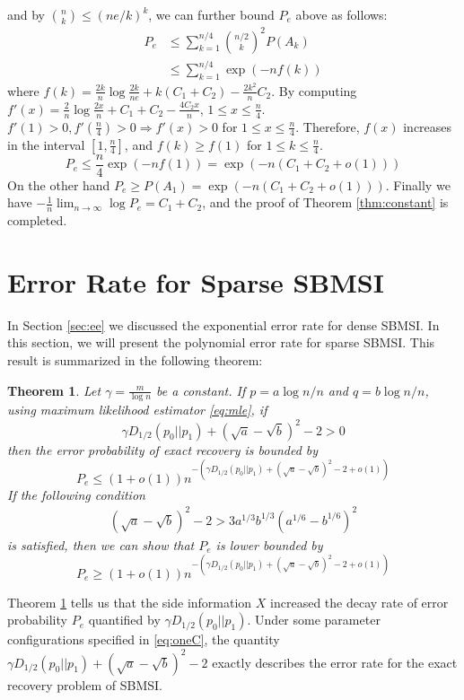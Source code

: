 \documentclass[conference,letterpaper]{IEEEtran}
\newtheorem{theorem}{Theorem}
\begin{document}
and by $\binom{n}{k} \leq (ne/k)^k$, we can further bound $P_e$ above as follows:
\begin{align*}
P_e & \leq \sum_{k=1}^{n/4} \binom{n/2}{k}^2 P(A_k) \\
& \leq \sum_{k=1}^{n/4} \exp(-nf(k))
\end{align*}
where
$f(k) = \frac{2k}{n}\log \frac{2k}{ne} + k(C_1+C_2) - \frac{2k^2}{n}C_2$.
By computing $f'(x)= \frac{2}{n} \log \frac{2x}{n} + C_1+C_2 - \frac{4C_2x}{n}$, $1\leq x \leq \frac{n}{4}$.
$f'(1) > 0 , f'(\frac{n}{4}) > 0 \Rightarrow f'(x) > 0$ for $1\leq x \leq \frac{n}{4}$.
Therefore, $f(x)$ increases in the interval $[1, \frac{n}{4}]$, and $f(k) \geq f(1)$ for $1\leq k \leq \frac{n}{4}$.
\begin{equation}
P_e \leq \frac{n}{4}\exp(-nf(1)) = \exp(-n (C_1+C_2+o(1)))
\end{equation}
On the other hand $P_e \geq P(A_1) = \exp(-n(C_1+C_2+o(1)))$.
Finally we have
$-\frac{1}{n} \lim_{n \to \infty} \log P_e = C_1+C_2$,
and the proof of Theorem \ref{thm:constant} is completed.

\section{Error Rate for Sparse SBMSI}\label{sec:ees}
In Section \ref{sec:ee} we discussed the exponential error rate for dense SBMSI.
In this section, we will present the polynomial error rate for sparse SBMSI.
This result is summarized in the following theorem:
\begin{theorem}\label{thm:Pe}
Let $\gamma = \frac{ m}{\log n}$ be a constant. If $p = a \log n /n$ and $q = b \log n / n$, using maximum likelihood estimator \eqref{eq:mle},
if
\begin{equation}\label{eq:positive_condition}
\gamma D_{1/2}(p_0||p_1) + (\sqrt{a} - \sqrt{b})^2-2 > 0
\end{equation}
then the error probability
of exact recovery is bounded by
\begin{equation}\label{eq:PeMain}
P_e \leq (1+o(1)) n^{-\left(\gamma D_{1/2}(p_0||p_1) + (\sqrt{a} - \sqrt{b})^2-2 + o(1)\right) }
\end{equation}
If the following condition
\begin{align}
(\sqrt{a}-\sqrt{b})^2-2 
> 3a^{1/3}b^{1/3}(a^{1/6}-b^{1/6})^2\label{eq:oneC}
\end{align}
is satisfied, then we can show that $P_e$ is lower bounded by
\begin{equation}\label{eq:PeMainL}
P_e \geq (1+o(1)) n^{-\left(\gamma D_{1/2}(p_0||p_1) + (\sqrt{a} - \sqrt{b})^2-2 + o(1)\right)}
\end{equation}
\end{theorem}
Theorem \ref{thm:Pe} tells us that the side information $X$ increased the
decay rate of error probability $P_e$ quantified by $\gamma D_{1/2}(p_0||p_1)$.
Under some parameter configurations specified in \eqref{eq:oneC},
the quantity $\gamma D_{1/2}(p_0||p_1) + (\sqrt{a} - \sqrt{b})^2-2$
exactly describes the error rate for the exact recovery problem of SBMSI.
\end{document}
